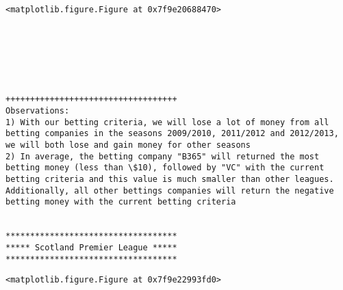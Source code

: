 \documentclass[11pt]{article}
\begin{document}
    
    \begin{verbatim}
<matplotlib.figure.Figure at 0x7f9e20688470>
    \end{verbatim}

    
    \begin{center}
    \end{center}
    { \hspace*{\fill} \\}
    
    \begin{center}
    \end{center}
    { \hspace*{\fill} \\}
    
    \begin{center}
    \end{center}
    { \hspace*{\fill} \\}
    
    \begin{Verbatim}[commandchars=\\\{\}]
+++++++++++++++++++++++++++++++++++
Observations: 
1) With our betting criteria, we will lose a lot of money from all betting companies in the seasons 2009/2010, 2011/2012 and 2012/2013, we will both lose and gain money for other seasons
2) In average, the betting company "B365" will returned the most betting money (less than \$10), followed by "VC" with the current betting criteria and this value is much smaller than other leagues. Additionally, all other bettings companies will return the negative betting money with the current betting criteria


***********************************
***** Scotland Premier League *****
***********************************

    \end{Verbatim}

    
    \begin{verbatim}
<matplotlib.figure.Figure at 0x7f9e22993fd0>
    \end{verbatim}

    
    \begin{center}
    \end{center}
    { \hspace*{\fill} \\}
    
\end{document}
